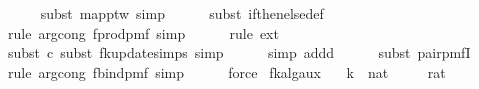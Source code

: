 \begin{isabellebody}
\ \ \ \ \isamarkupfalse%
\ {\isacharparenleft}{\kern0pt}subst\ map{\isacharunderscore}{\kern0pt}ptw{\isacharcomma}{\kern0pt}\ simp{\isacharparenright}{\kern0pt}\isanewline
\ \ \ \ \isamarkupfalse%
\ {\isacharparenleft}{\kern0pt}subst\ if{\isacharunderscore}{\kern0pt}then{\isacharunderscore}{\kern0pt}else{\isacharunderscore}{\kern0pt}def{\isacharparenright}{\kern0pt}\isanewline
\ \ \ \ \isamarkupfalse%
\ {\isacharparenleft}{\kern0pt}rule\ arg{\isacharunderscore}{\kern0pt}cong{}{\isacharbrackleft}{\kern0pt}\ f{\isacharequal}{\kern0pt}{\isachardoublequoteopen}prod{\isacharunderscore}{\kern0pt}pmf{\isachardoublequoteclose}{\isacharbrackright}{\kern0pt}{\isacharcomma}{\kern0pt}\ simp{\isacharparenright}{\kern0pt}\isanewline
\ \ \ \ \isamarkupfalse%
\ {\isacharparenleft}{\kern0pt}rule\ ext{\isacharparenright}{\kern0pt}\isanewline
\ \ \ \ \isamarkupfalse%
\ {\isacharparenleft}{\kern0pt}subst\ c{\isacharcomma}{\kern0pt}\ subst\ fk{\isacharunderscore}{\kern0pt}update{\isacharprime}{\kern0pt}{\isacharprime}{\kern0pt}{\isachardot}{\kern0pt}simps{\isacharcomma}{\kern0pt}\ simp{\isacharparenright}{\kern0pt}\isanewline
\ \ \ \ \isamarkupfalse%
\ {\isacharparenleft}{\kern0pt}simp\ add{\isacharcolon}{\kern0pt}d{\isacharparenright}{\kern0pt}\isanewline
\ \ \ \ \isamarkupfalse%
\ {\isacharparenleft}{\kern0pt}subst\ pair{\isacharunderscore}{\kern0pt}pmfI{\isacharparenright}{\kern0pt}\isanewline
\ \ \ \ \isamarkupfalse%
\ {\isacharparenleft}{\kern0pt}rule\ arg{\isacharunderscore}{\kern0pt}cong{}{\isacharbrackleft}{\kern0pt}\ f{\isacharequal}{\kern0pt}{\isachardoublequoteopen}bind{\isacharunderscore}{\kern0pt}pmf{\isachardoublequoteclose}{\isacharbrackright}{\kern0pt}{\isacharcomma}{\kern0pt}\ simp{\isacharparenright}{\kern0pt}\isanewline
\ \ \ \ \isamarkupfalse%
\ force\isanewline
{}\isamarkupfalse%
%
\endisatagproof
{\isafoldproof}%
%
\isadelimproof
\isanewline
%
\endisadelimproof
\isanewline
{}\isamarkupfalse%
\ fk{\isacharunderscore}{\kern0pt}alg{\isacharunderscore}{\kern0pt}aux{\isacharunderscore}{\kern0pt}{}{\isacharcolon}{\kern0pt}\isanewline
\ \ \ k\ {\isacharcolon}{\kern0pt}{\isacharcolon}{\kern0pt}\ nat\isanewline
\ \ \ {\isasymepsilon}\ {\isacharcolon}{\kern0pt}{\isacharcolon}{\kern0pt}\ rat\isanewline
\ \ \ {\isachardoublequoteopen}{\isasymdelta}\ {\isachargreater}{\kern0pt}\ {}{\isachardoublequoteclose}\isanewline

\end{isabellebody}
